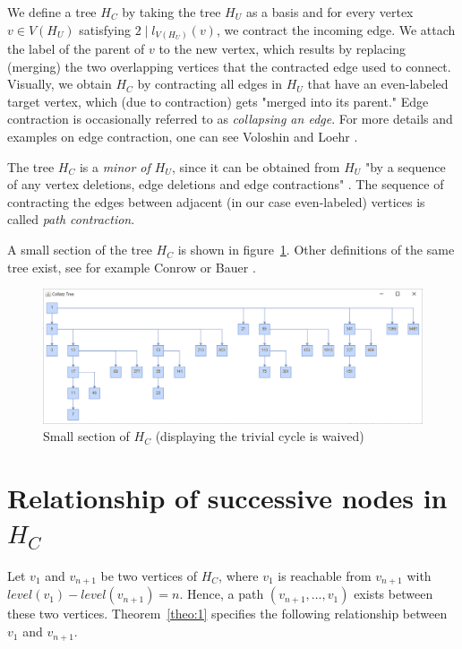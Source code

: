 \par\medskip
We define a tree $H_C$ by taking the tree $H_U$ as a basis and for every
vertex $v\in V(H_U)$ satisfying $2\mid l_{V(H_U)}(v)$, we contract the
incoming edge. We attach the label of the parent of $v$ to the new
vertex, which results by replacing (merging) the two overlapping
vertices that the contracted edge used to connect. Visually, we
obtain $H_C$ by contracting all edges in $H_U$ that have an even-labeled 
target vertex, which (due to contraction) gets "merged into its parent." 
Edge contraction is occasionally referred to as \textit{collapsing an 
edge}. For more details and examples on edge contraction, one can see
Voloshin \cite[p.~27]{Ref_Voloshin} and Loehr \cite{Ref_Loehr}.

\par\medskip
The tree $H_C$ is a \textit{minor of $H_U$}, since it can be obtained
from $H_U$ "by a sequence of any vertex deletions, edge deletions and
edge contractions" \cite[p.~32]{Ref_Voloshin}. The sequence of contracting
the edges between adjacent (in our case even-labeled) vertices is called
\textit{path contraction}.

\par\medskip
A small section of the tree $H_C$ is shown in figure~\ref{fig:2}. Other
definitions of the same tree exist, see for example Conrow 
\cite{Ref_Conrow} or Bauer \cite[p.~379]{Ref_Bauer}.

\begin{figure}
	\includegraphics[width=1.00\textwidth]{figures/h_c.png}
	\caption{Small section of $H_C$ (displaying the trivial cycle is waived)}
	\label{fig:2}
\end{figure}

\section{Relationship of successive nodes in \mbox{$H_C$}}

Let $v_1$ and $v_{n+1}$ be two vertices of $H_C$, where $v_1$ is reachable from $v_{n+1}$ with $level(v_1)-level(v_{n+1})=n$. Hence, a path $(v_{n+1},\ldots,v_1)$ exists between these two vertices. Theorem~\ref{theo:1} specifies the following relationship between $v_1$ and $v_{n+1}$.

